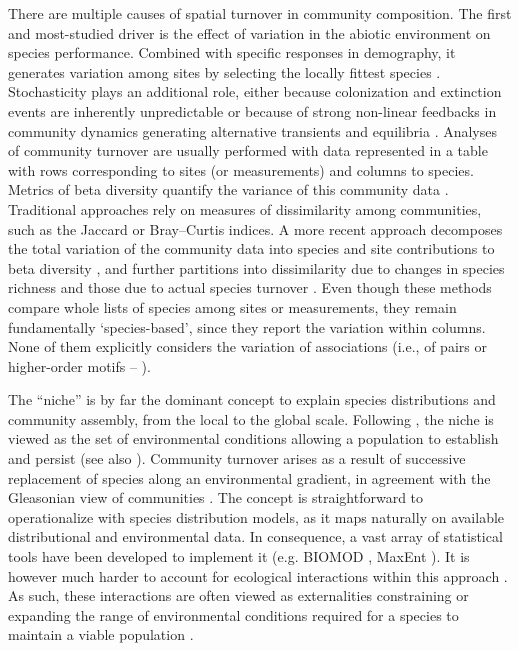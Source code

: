 \documentclass[12pt]{article}
\begin{document}
There are multiple causes of spatial turnover in community composition. The
first and most-studied driver is the effect of variation in the abiotic
environment on species performance. Combined with specific responses in
demography, it generates variation among sites by selecting the locally
fittest species \citep{Leibold2004}. Stochasticity plays an additional role,
either because colonization and extinction events \citep{Hanski1999} are inherently
unpredictable or because of strong non-linear feedbacks in community dynamics
generating alternative transients and equilibria \citep{Chase2007,
Vellend2014}. Analyses of community turnover are usually performed with data
represented in a table with rows corresponding to sites (or measurements) and
columns to species. Metrics of beta diversity quantify the variance of this
community data \citep{Legendre2005}. Traditional approaches rely on measures
of dissimilarity among communities, such as the Jaccard or Bray–Curtis
indices. A more recent approach decomposes the total variation of the
community data into species and site contributions to beta diversity
\citep{Legendre2013}, and further partitions into dissimilarity due to changes
in species richness and those due to actual species turnover \citep{Baselga2010;
Carvalho et al. 2012}. Even though these methods compare whole lists of
species among sites or measurements, they remain fundamentally `species-based',
since they report the variation within columns. None of them
explicitly considers the variation of associations (i.e., of pairs or higher-order
motifs – \citealt{Stouffer2007}).

The ``niche'' is by far the dominant concept to explain species distributions
and community assembly, from the local to the global scale. Following
\citealt{Hutchinson1957}, the niche is viewed as the set of environmental
conditions allowing a population to establish and persist (see also
\citealt{Holt2009}). Community turnover arises as a result of successive
replacement of species along an environmental gradient, in agreement with the
Gleasonian view of communities \citep{Gleason1926}. The concept is
straightforward to operationalize with species distribution models, as it maps
naturally on available distributional and environmental data. In consequence,
a vast array of statistical tools have been developed to implement it (e.g.
BIOMOD \citealt{Thuiller2003}, MaxEnt \citealt{Phillips2006}). It is however
much harder to account for ecological interactions within this approach
\citep{Peterson2011}. As such, these interactions are often viewed as externalities
constraining or expanding the range of environmental conditions required for a
species to maintain a viable population \citep{Pulliam2000, Soberon2007, Boulangeat2012}.
\end{document}

